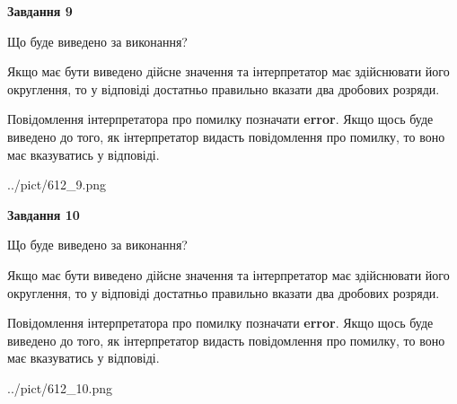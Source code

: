 \documentclass[12pt, ukrainian]{article}
\begin{document}
{\begin {Large}
{\begin {center}\textbf{Завдання 9}\end {center}}\par
Що буде виведено за виконання? \par

Якщо має бути виведено дійсне значення та інтерпретатор має здійснювати його округлення, 
то у відповіді достатньо правильно вказати два дробових розряди.

Повідомлення інтерпретатора про помилку позначати \textbf{error}.
Якщо щось буде виведено до того, як інтерпретатор видасть повідомлення про помилку, 
то воно має вказуватись у відповіді. \par

\begin{center}
	{../pict/612_9.png}
\end{center}
\newpage

{\begin {center}\textbf{Завдання 10}\end {center}}\par
Що буде виведено за виконання? \par

Якщо має бути виведено дійсне значення та інтерпретатор має здійснювати його округлення, 
то у відповіді достатньо правильно вказати два дробових розряди.

Повідомлення інтерпретатора про помилку позначати \textbf{error}.
Якщо щось буде виведено до того, як інтерпретатор видасть повідомлення про помилку, 
то воно має вказуватись у відповіді. \par

\begin{center}
	{../pict/612_10.png}
\end{center}
\newpage

\end {Large}}
\end{document}
